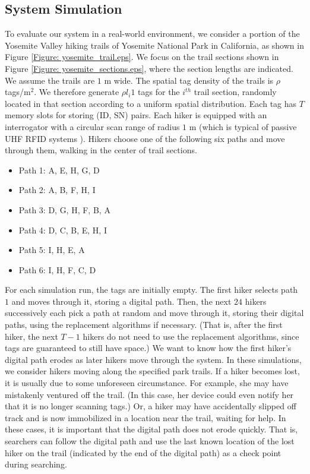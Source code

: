 \subsection{System Simulation}
To evaluate our system in a real-world environment, we consider a portion of the Yosemite Valley hiking trails \cite{Yosemite} of Yosemite National Park in California, as shown in Figure \ref{Figure: yosemite_trail.eps}.  We focus on the trail sections shown in Figure \ref{Figure: yosemite_sections.eps}, where the section lengths are indicated.  We assume the trails are $1$ m wide.  The spatial tag density of the trails is $\rho$ tags/m$^2$.  We therefore generate $\rho l_i 1$ tags for the $i^{th}$ trail section, randomly located in that section according to a uniform spatial distribution.  Each tag has $T$ memory slots for storing (ID, SN) pairs.  Each hiker is equipped with an interrogator with a circular scan range of radius $1$ m (which is typical of passive UHF RFID systems \cite{2003 Finkenzeller}).  Hikers choose one of the following six paths and move through them, walking in the center of trail sections.
\begin{itemize}
\item Path 1: A, E, H, G, D
\item Path 2: A, B, F, H, I
\item Path 3: D, G, H, F, B, A
\item Path 4: D, C, B, E, H, I
\item Path 5: I, H, E, A
\item Path 6: I, H, F, C, D
\end{itemize}
For each simulation run, the tags are initially empty.  The first hiker selects path $1$ and moves through it, storing a digital path.  Then, the next $24$ hikers successively each pick a path at random and move through it, storing their digital paths, using the replacement algorithms if necessary.  (That is, after the first hiker, the next $T-1$ hikers do not need to use the replacement algorithms, since tags are guaranteed to still have space.)  We want to know how the first hiker's digital path erodes as later hikers move through the system. In these simulations, we consider hikers moving along the specified park trails.  If a hiker becomes lost, it is usually due to some unforeseen circumstance.  For example, she may have mistakenly ventured off the trail.  (In this case, her device could even notify her that it is no longer scanning tags.) Or, a hiker may have accidentally slipped off track and is now immobilized in a location near the trail, waiting for help.  In these cases, it is important that the digital path does not erode quickly.  That is, searchers can follow the digital path and use the last known location of the lost hiker on the trail (indicated by the end of the digital path) as a check point during searching.

